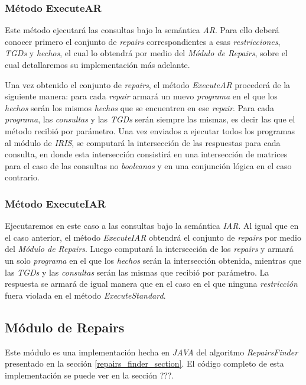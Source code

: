 \documentclass[11pt,a4paper,twoside]{tesis}
\begin{document}
\subsubsection{Método ExecuteAR}

Este método ejecutará las consultas bajo la semántica \textit{AR}. Para ello deberá conocer primero el conjunto de \textit{repairs} correspondientes a esas \textit{restricciones}, \textit{TGDs} y \textit{hechos}, el cual lo obtendrá por medio del \textit{Módulo de Repairs}, sobre el cual detallaremos su implementación más adelante. 

Una vez obtenido el conjunto de \textit{repairs}, el método \textit{ExecuteAR} procederá de la siguiente manera: para cada \textit{repair} armará un nuevo \textit{programa} en el que los \textit{hechos} serán los mismos \textit{hechos} que se encuentren en ese \textit{repair}. Para cada \textit{programa}, las \textit{consultas} y las \textit{TGDs} serán siempre las mismas, es decir las que el método recibió por parámetro. Una vez enviados a ejecutar todos los programas al módulo de \textit{IRIS}, se computará la intersección de las respuestas para cada consulta, en donde esta intersección consistirá en una intersección de matrices para el caso de las consultas no \textit{booleanas} y en una conjunción lógica en el caso contrario.

\subsubsection{Método ExecuteIAR}

Ejecutaremos en este caso a las consultas bajo la semántica \textit{IAR}. Al igual que en el caso anterior, el método \textit{ExecuteIAR} obtendrá el conjunto de \textit{repairs} por medio del \textit{Módulo de Repairs}. Luego computará la intersección de los \textit{repairs} y armará un solo \textit{programa} en el que los \textit{hechos} serán la intersección obtenida, mientras que las \textit{TGDs} y las \textit{consultas} serán las mismas que recibió por parámetro. La respuesta se armará de igual manera que en el caso en el que ninguna \textit{restricción} fuera violada en el método  \textit{ExecuteStandard}.

\subsection{Módulo de Repairs}\label{modulo_de_repairs}

Este módulo es una implementación hecha en \textit{JAVA} del algoritmo \textit{RepairsFinder} presentado en la sección \ref{repairs_finder_section}. El código completo de esta implementación se puede ver en la sección ???. 
\end{document}
